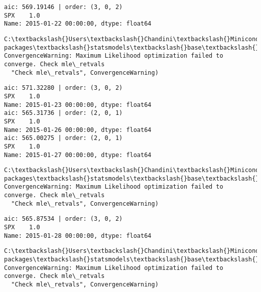 \documentclass[11pt]{article}
\begin{document}
    \begin{Verbatim}[commandchars=\\\{\}]
aic: 569.19146 | order: (3, 0, 2)
SPX    1.0
Name: 2015-01-22 00:00:00, dtype: float64

    \end{Verbatim}

    \begin{Verbatim}[commandchars=\\\{\}]
C:\textbackslash{}Users\textbackslash{}Chandini\textbackslash{}Miniconda3\textbackslash{}envs\textbackslash{}auquan\textbackslash{}lib\textbackslash{}site-packages\textbackslash{}statsmodels\textbackslash{}base\textbackslash{}model.py:496: ConvergenceWarning: Maximum Likelihood optimization failed to converge. Check mle\_retvals
  "Check mle\_retvals", ConvergenceWarning)

    \end{Verbatim}

    \begin{Verbatim}[commandchars=\\\{\}]
aic: 571.32280 | order: (3, 0, 2)
SPX    1.0
Name: 2015-01-23 00:00:00, dtype: float64
aic: 565.31736 | order: (2, 0, 1)
SPX    1.0
Name: 2015-01-26 00:00:00, dtype: float64
aic: 565.00275 | order: (2, 0, 1)
SPX    1.0
Name: 2015-01-27 00:00:00, dtype: float64

    \end{Verbatim}

    \begin{Verbatim}[commandchars=\\\{\}]
C:\textbackslash{}Users\textbackslash{}Chandini\textbackslash{}Miniconda3\textbackslash{}envs\textbackslash{}auquan\textbackslash{}lib\textbackslash{}site-packages\textbackslash{}statsmodels\textbackslash{}base\textbackslash{}model.py:496: ConvergenceWarning: Maximum Likelihood optimization failed to converge. Check mle\_retvals
  "Check mle\_retvals", ConvergenceWarning)

    \end{Verbatim}

    \begin{Verbatim}[commandchars=\\\{\}]
aic: 565.87534 | order: (3, 0, 2)
SPX    1.0
Name: 2015-01-28 00:00:00, dtype: float64

    \end{Verbatim}

    \begin{Verbatim}[commandchars=\\\{\}]
C:\textbackslash{}Users\textbackslash{}Chandini\textbackslash{}Miniconda3\textbackslash{}envs\textbackslash{}auquan\textbackslash{}lib\textbackslash{}site-packages\textbackslash{}statsmodels\textbackslash{}base\textbackslash{}model.py:496: ConvergenceWarning: Maximum Likelihood optimization failed to converge. Check mle\_retvals
  "Check mle\_retvals", ConvergenceWarning)

    \end{Verbatim}
\end{document}
